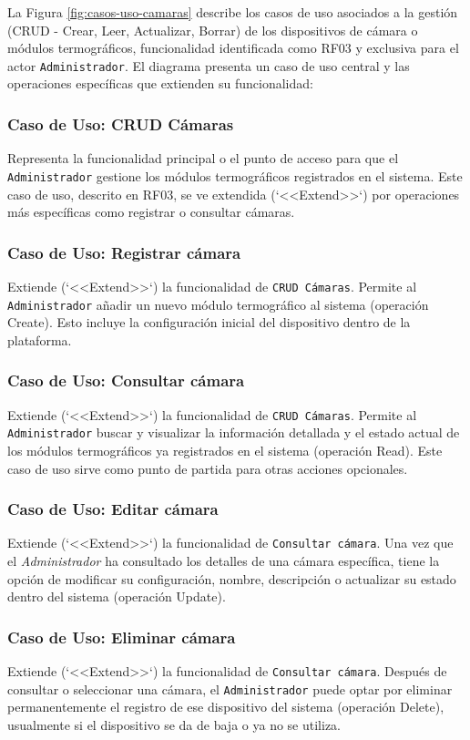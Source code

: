La Figura \ref{fig:casos-uso-camaras} describe los casos de uso asociados a la gestión (CRUD - Crear, Leer, Actualizar, Borrar) de los dispositivos de cámara o módulos termográficos, funcionalidad identificada como RF03 y exclusiva para el actor \texttt{Administrador}. El diagrama presenta un caso de uso central y las operaciones específicas que extienden su funcionalidad:

\subsubsection*{Caso de Uso: CRUD Cámaras}
Representa la funcionalidad principal o el punto de acceso para que el \texttt{Administrador} gestione los módulos termográficos registrados en el sistema. Este caso de uso, descrito en RF03, se ve extendida (`<<Extend>>`) por operaciones más específicas como registrar o consultar cámaras.

\subsubsection*{Caso de Uso: Registrar cámara}
Extiende (`<<Extend>>`) la funcionalidad de \texttt{CRUD Cámaras}. Permite al \texttt{Administrador} añadir un nuevo módulo termográfico al sistema (operación Create). Esto incluye la configuración inicial del dispositivo dentro de la plataforma.

\subsubsection*{Caso de Uso: Consultar cámara}
Extiende (`<<Extend>>`) la funcionalidad de \texttt{CRUD Cámaras}. Permite al \texttt{Administrador} buscar y visualizar la información detallada y el estado actual de los módulos termográficos ya registrados en el sistema (operación Read). Este caso de uso sirve como punto de partida para otras acciones opcionales.

\subsubsection*{Caso de Uso: Editar cámara}
Extiende (`<<Extend>>`) la funcionalidad de \texttt{Consultar cámara}. Una vez que el \textit{Administrador} ha consultado los detalles de una cámara específica, tiene la opción de modificar su configuración, nombre, descripción o actualizar su estado dentro del sistema (operación Update).

\subsubsection*{Caso de Uso: Eliminar cámara}
Extiende (`<<Extend>>`) la funcionalidad de \texttt{Consultar cámara}. Después de consultar o seleccionar una cámara, el \texttt{Administrador} puede optar por eliminar permanentemente el registro de ese dispositivo del sistema (operación Delete), usualmente si el dispositivo se da de baja o ya no se utiliza.


